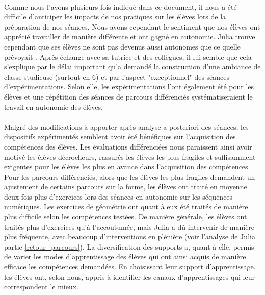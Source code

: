 \paragraph*{} Comme nous l'avons plusieurs fois indiqué dans ce document, il nous a été difficile d'anticiper les impacts de nos pratiques sur les élèves lors de la préparation de nos séances. Nous avons cependant le sentiment que nos élèves ont apprécié travailler de manière différente et ont gagné en autonomie. Julia trouve cependant que ses élèves ne sont pas devenus aussi autonomes que ce quelle prévoyait . Après échange avec sa tutrice et des collègues, il lui semble que cela s'explique par le délai important qu'a demandé la construction d'une ambiance de classe studieuse (surtout en 6) et par l'aspect "exceptionnel" des séances d'expérimentations. Selon elle, les expérimentations l'ont également été pour les élèves et une répétition des séances de parcours différenciés  systématiseraient le travail en autonomie des élèves. \\
\\
Malgré des modifications à apporter après analyse a posteriori des séances, les dispositifs expérimentés semblent avoir été bénéfiques sur l'acquisition des compétences des élèves. Les évaluations différenciées nous paraissent ainsi avoir motivé les élèves décrocheurs, rassurés les élèves les plus fragiles et suffisamment exigentes pour les élèves les plus en avance dans l'acquisition des compétences. Pour les parcours différenciés, alors que les élèves les plus fragiles demandent un ajustement de certains parcours sur la forme, les élèves ont traité en moyenne deux fois plus d'exercices lors des séances en autonomie sur les séquences numériques. Les exercices de géométrie ont quant à eux été traités de manière plus difficile selon les compétences testées. De manière générale, les élèves ont traités plus d'exercices qu'à l'accoutumée, mais Julia a dû intervenir de manière plus fréquente, avec beaucoup d'interventions en plénière (voir l'analyse de Julia partie \ref{retour_parcours}). La diversification des supports a, quant à elle, permis de varier les modes d'apprentissage des élèves qui ont ainsi acquis de manière efficace les compétences demandées. En choisissant leur support d'apprentissage,  les élèves ont, selon nous, appris à identifier les canaux d'apprentissages  qui leur correspondent le mieux.\\
